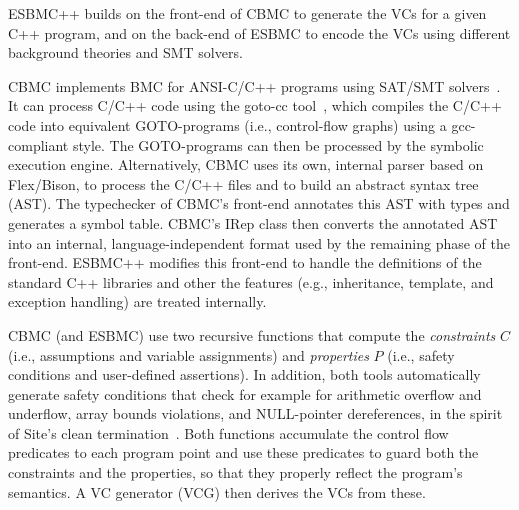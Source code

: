 \documentclass[a4paper]{llncs}
\begin{document}
ESBMC++ builds on the front-end of CBMC to generate the VCs for a given C++ program,
and on the back-end of ESBMC to encode the VCs using different background theories
and SMT solvers.

\smallskip{}
%
CBMC implements BMC for ANSI-C/C++ programs using SAT/SMT
solvers~\cite{Clarke04}.  It can process C/C++ code using the goto-cc
tool~\cite{Wintersteiger09}, which compiles the C/C++ code into
equivalent GOTO-programs (i.e., control-flow graphs) using a
gcc-compliant style. The GOTO-programs can then be processed by the
symbolic execution engine. Alternatively, CBMC uses its own, internal
parser based on Flex/Bison, to process the C/C++ files and to build an
abstract syntax tree (AST). The typechecker of CBMC's front-end
annotates this AST with types and generates a symbol table. CBMC's IRep
class then converts the annotated AST into an internal,
language-independent format used by the remaining phase of the
front-end.  ESBMC++ modifies this front-end to handle the definitions of
the standard C++ libraries and other the features (e.g., inheritance,
template, and exception handling) are treated internally.

CBMC (and ESBMC) use two recursive functions that compute the
\emph{constraints} $C$ (i.e., assumptions and variable assignments) and
\emph{properties} $P$ (i.e., safety conditions and user-defined
assertions). In addition, both tools automatically generate safety conditions
that check for example for arithmetic overflow and underflow, array bounds
violations, and NULL-pointer dereferences, in the spirit of Site's clean
termination~\cite{Sites74}. Both functions accumulate the control flow
predicates to each program point and use these predicates to guard both
the constraints and the properties, so that they properly reflect the
program's semantics. A VC generator (VCG) then derives the VCs from
these.
\end{document}
